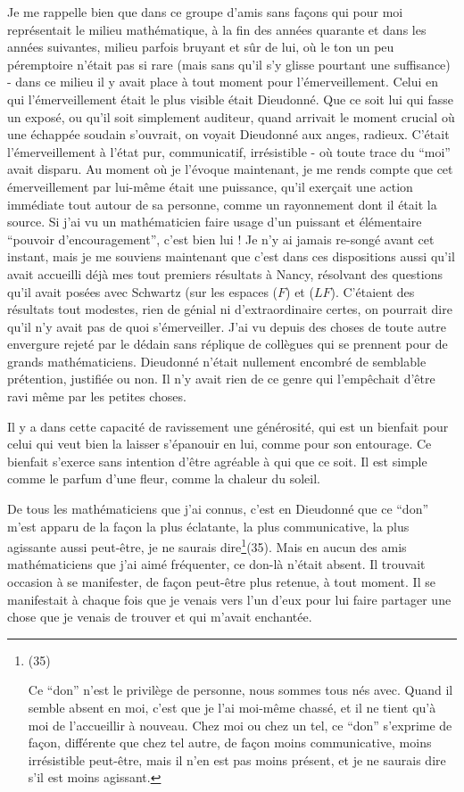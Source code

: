 Je me rappelle bien que dans ce groupe d'amis sans façons qui pour moi représentait le milieu mathématique, à la fin des années quarante et dans les années suivantes, milieu parfois bruyant et sûr de lui, où le ton un peu péremptoire n'était pas si rare (mais sans qu'il s'y glisse pourtant une suffisance) - dans ce milieu il y avait place à tout moment pour l'émerveillement. Celui en qui l'émerveillement était le plus visible était Dieudonné. Que ce soit lui qui fasse un exposé, ou qu'il soit simplement auditeur, quand arrivait le moment crucial où une échappée soudain s'ouvrait, on voyait Dieudonné aux anges, radieux. C'était l'émerveillement à l'état pur, communicatif, irrésistible - où toute trace du ``moi'' avait disparu. Au moment où je l'évoque maintenant, je me rends compte que cet émerveillement par lui-même était une puissance, qu'il exerçait une action immédiate tout autour de sa personne, comme un rayonnement dont il était la source. Si j'ai vu un mathématicien faire usage d'un puissant et élémentaire ``pouvoir d'encouragement'', c'est bien lui ! Je n'y ai jamais re-songé avant cet instant, mais je me souviens maintenant que c'est dans ces dispositions aussi qu'il avait accueilli déjà mes tout premiers résultats à Nancy, résolvant des questions qu'il avait posées avec Schwartz (sur les espaces (\(F\)) et (\(LF\)). C'étaient des résultats tout modestes, rien de génial ni d'extraordinaire certes, on pourrait dire qu'il n'y avait pas de quoi s'émerveiller. J'ai vu depuis des choses de toute autre envergure rejeté par le dédain sans réplique de collègues qui se prennent pour de grands mathématiciens. Dieudonné n'était nullement encombré de semblable prétention, justifiée ou non. Il n'y avait rien de ce genre qui l'empêchait d'être ravi même par les petites choses.

Il y a dans cette capacité de ravissement une générosité, qui est un bienfait pour celui qui veut bien la laisser s'épanouir en lui, comme pour son entourage. Ce bienfait s'exerce sans intention d'être agréable à qui que ce soit. Il est simple comme le parfum d'une fleur, comme la chaleur du soleil.

De tous les mathématiciens que j'ai connus, c'est en Dieudonné que ce ``don'' m'est apparu de la façon la plus éclatante, la plus communicative, la plus agissante aussi peut-être, je ne saurais dire\footnote{(35) \par Ce ``don'' n'est le privilège de personne, nous sommes tous nés avec. Quand il semble absent en moi, c'est que je l'ai moi-même chassé, et il ne tient qu'à moi de l'accueillir à nouveau. Chez moi ou chez un tel, ce ``don'' s'exprime de façon, différente que chez tel autre, de façon moins communicative, moins irrésistible peut-être, mais il n'en est pas moins présent, et je ne saurais dire s'il est moins agissant.}(35). Mais en aucun des amis mathématiciens que j'ai aimé fréquenter, ce don-là n'était absent. Il trouvait occasion à se manifester, de façon peut-être plus retenue, à tout moment. Il se manifestait à chaque fois que je venais vers l'un d'eux pour lui faire partager une chose que je venais de trouver et qui m'avait enchantée.

